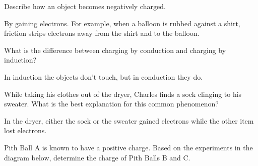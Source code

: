 \documentclass[answers]{exam}
\begin{document}
\begin{questions}
\question
Describe how an object becomes negatively charged.

\ifprintanswers
{\color{red}
By gaining electrons. For example, when a balloon is rubbed against a shirt, friction strips electrons away from the shirt and to the balloon.}
\else
\fillwithlines{1.3cm}
\fi


\question
What is the difference between charging by conduction and charging by induction?

\ifprintanswers
{\color{red}
In induction the objects don’t touch, but in conduction they do.
}
\else
\fillwithlines{1.3cm}
\fi


\question
While taking his clothes out of the dryer, Charles finds a sock clinging to his sweater. What is the best explanation for this common phenomenon? 

\ifprintanswers
{\color{red}
In the dryer, either the sock or the sweater gained electrons while the other item lost electrons.
}
\else
\fillwithlines{1.3cm}
\fi


\question
Pith Ball A is known to have a positive charge.  Based on the experiments in the diagram below, determine the charge of Pith Balls B and C.


\end{questions}
\end{document}
